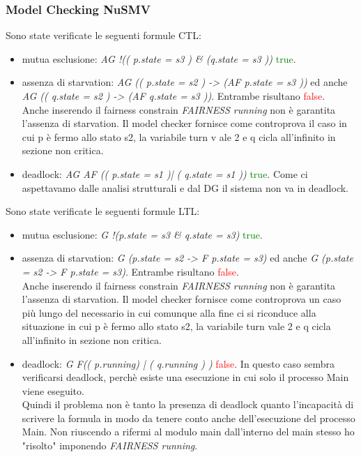 \documentclass[a4paper]{article}
\begin{document}
\subsubsection{Model Checking NuSMV}
Sono state verificate le seguenti formule CTL:
\begin{itemize}
        \item mutua esclusione: \textit{AG !(( p.state = s3 ) \& (q.state = s3 ))} \textcolor{green}{true}.
        \item assenza di starvation: \textit{AG (( p.state = s2 ) -> (AF p.state = s3 ))} ed anche \textit{AG (( q.state = s2 ) -> (AF q.state = s3 ))}. Entrambe risultano \textcolor{red}{false}.\\
                Anche inserendo il fairness constrain \textit{FAIRNESS running} non è garantita l'assenza di starvation. Il model checker fornisce come controprova il caso in cui p è fermo allo stato s2, la variabile turn v
ale 2 e q cicla all'infinito in sezione non critica.
        \item deadlock: \textit{AG AF (( p.state = s1 )| ( q.state = s1 ))} \textcolor{green}{true}. Come ci aspettavamo dalle analisi strutturali e dal DG il sistema non va in deadlock.
\end{itemize}
Sono state verificate le seguenti formule LTL:
\begin{itemize}
        \item mutua esclusione: \textit{G !(p.state = s3 \& q.state = s3)} \textcolor{green}{true}.
        \item assenza di starvation: \textit{G (p.state = s2 ->  F p.state = s3)} ed anche \textit{G (p.state = s2 ->  F p.state = s3)}. Entrambe risultano \textcolor{red}{false}.\\
		Anche inserendo il fairness constrain \textit{FAIRNESS running} non è garantita l'assenza di starvation. Il model checker fornisce come controprova un caso più lungo del necessario in cui comunque alla fine ci si riconduce alla situazione in cui p è fermo allo stato s2, la variabile turn vale 2 e q cicla all'infinito in sezione non critica.
        \item deadlock: \textit{G F(( p.running) | ( q.running ) )} \textcolor{red}{false}. In questo caso sembra verificarsi deadlock, perchè esiste una esecuzione in cui solo il processo Main viene eseguito.\\
		Quindi il problema non è tanto la presenza di deadlock quanto l'incapacità di scrivere la formula in modo da tenere conto anche dell'esecuzione del processo Main. Non riuscendo a rifermi al modulo main dall'interno del main stesso ho "risolto" imponendo \textit{FAIRNESS running}.
\end{itemize}
\end{document}
